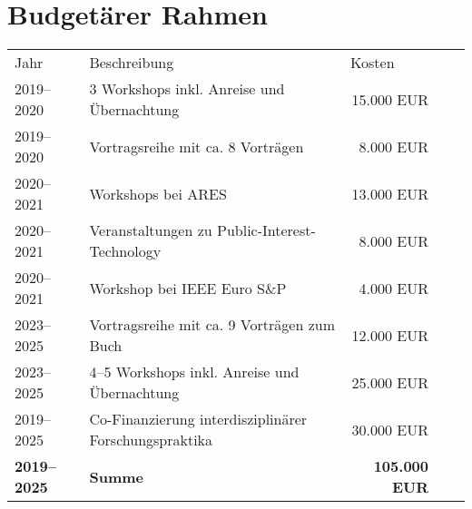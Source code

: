 \documentclass[11pt]{scrartcl}
\begin{document}
\section{Budgetärer Rahmen}

\begin{center}
\begin{tabular}{lllll}
\cline{1-3}
\multicolumn{1}{|l|}{Jahr} & \multicolumn{1}{l|}{Beschreibung} & \multicolumn{1}{l|}{Kosten}   \\ \cline{1-3}
\multicolumn{1}{|l|}{2019--2020} & \multicolumn{1}{l|}{3 Workshops  inkl. Anreise und Übernachtung
} & \multicolumn{1}{r|}{15.000 EUR} &  \\ \cline{1-3}
\multicolumn{1}{|l|}{2019--2020} & \multicolumn{1}{l|}{Vortragsreihe mit ca. 8 Vorträgen
} & \multicolumn{1}{r|}{8.000 EUR}  &  \\ \cline{1-3}

\multicolumn{1}{|l|}{2020--2021} & \multicolumn{1}{l|}{Workshops bei ARES
} & \multicolumn{1}{r|}{13.000 EUR}  &  \\ \cline{1-3}
\multicolumn{1}{|l|}{2020--2021} & \multicolumn{1}{l|}{Veranstaltungen zu Public-Interest-Technology
} & \multicolumn{1}{r|}{8.000 EUR}  &  \\ \cline{1-3}
\multicolumn{1}{|l|}{2020--2021} & \multicolumn{1}{l|}{Workshop bei IEEE Euro S\&P
} & \multicolumn{1}{r|}{4.000 EUR}  &  \\ \cline{1-3}

\multicolumn{1}{|l|}{2023--2025} & \multicolumn{1}{l|}{Vortragsreihe mit ca. 9 Vorträgen zum Buch
} & \multicolumn{1}{r|}{12.000 EUR}  &  \\ \cline{1-3}
\multicolumn{1}{|l|}{2023--2025} & \multicolumn{1}{l|}{4--5 Workshops  inkl. Anreise und Übernachtung
} & \multicolumn{1}{r|}{25.000 EUR} &  \\ \cline{1-3}
\multicolumn{1}{|l|}{2019--2025} & \multicolumn{1}{l|}{ Co-Finanzierung interdisziplinärer Forschungspraktika
} & \multicolumn{1}{r|}{ 30.000 EUR} &  \\ \cline{1-3}
\multicolumn{1}{|l|}{\bfseries 2019--2025} & \multicolumn{1}{l|}{\bfseries Summe
} & \multicolumn{1}{r|}{\bfseries 105.000 EUR} &  \\ \cline{1-3}
\end{tabular}
\end{center}




\newpage


\end{document}
